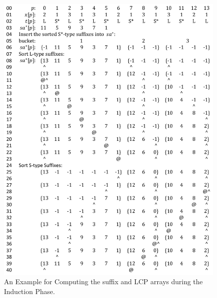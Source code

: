 \documentclass[10pt,journal,compsoc]{IEEEtran}
\begin{document}
\begin{figure}
	\centering
	\includegraphics[width = 0.9\columnwidth]{example2}

	\caption{An Example for Computing the suffix and LCP arrays during the Induction Phase. \label{fig:example2}}	
\end{figure}
 


	
\end{document}
